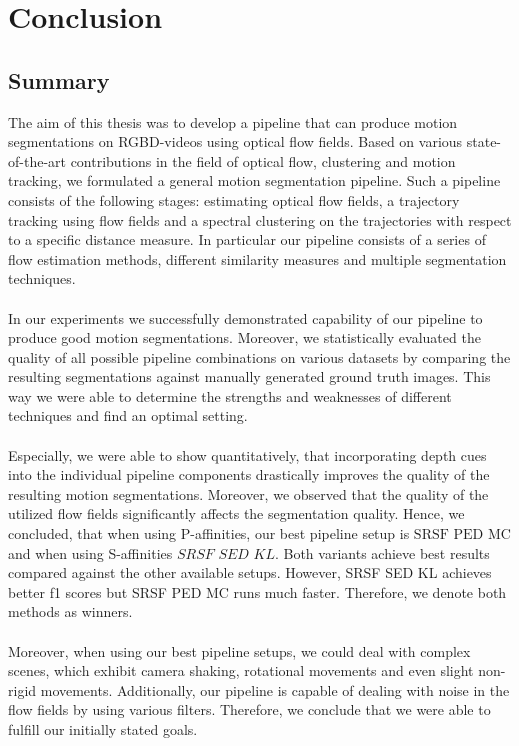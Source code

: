 \chapter{Conclusion}
\section{Summary}
The aim of this thesis was to develop a pipeline that can produce motion segmentations on RGBD-videos using optical flow fields. Based on various state-of-the-art contributions in the field of optical flow, clustering and motion tracking, we formulated a general motion segmentation pipeline. Such a pipeline consists of the following stages: estimating optical flow fields, a trajectory tracking using flow fields and a spectral clustering on the trajectories with respect to a specific distance measure. In particular our pipeline consists of a series of flow estimation methods, different similarity measures and multiple segmentation techniques. \\ \\ 
In our experiments we successfully demonstrated capability of our pipeline to produce good motion segmentations. Moreover, we statistically evaluated the quality of all possible pipeline combinations on various datasets by comparing the resulting segmentations against manually generated ground truth images. This way we were able to determine the strengths and weaknesses of different techniques and find an optimal setting. \\ \\
Especially, we were able to show quantitatively, that incorporating depth cues into the individual pipeline components drastically improves the quality of the resulting motion segmentations. Moreover, we observed that the quality of the utilized flow fields significantly affects the segmentation quality. Hence, we concluded, that when using P-affinities, our best pipeline setup is $\text{SRSF PED MC}$ and when using S-affinities $\textit{SRSF SED KL}$. Both variants achieve best results compared against the other available setups. However, SRSF SED KL achieves better f1 scores but SRSF PED MC runs much faster. Therefore, we denote both methods as winners.  \\ \\
Moreover, when using our best pipeline setups, we could deal with complex scenes, which exhibit camera shaking, rotational movements and even slight non-rigid movements. Additionally, our pipeline is capable of dealing with noise in the flow fields by using various filters. Therefore, we conclude that we were able to fulfill our initially stated goals. \\ \\

